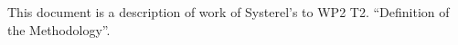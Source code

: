 
This document is a description of work of Systerel's to WP2 T2. ``Definition of
the Methodology''.

